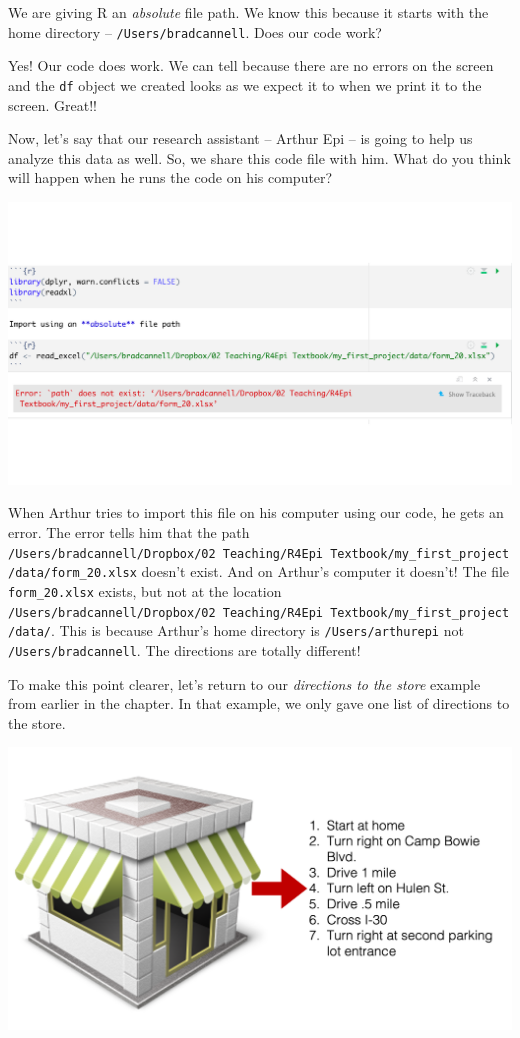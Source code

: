 \documentclass[
  letterpaper,
  DIV=11,
  numbers=noendperiod]{scrreprt}
\begin{document}
We are giving R an \emph{absolute} file path. We know this because it
starts with the home directory -- \texttt{/Users/bradcannell}. Does our
code work?

Yes! Our code does work. We can tell because there are no errors on the
screen and the \texttt{df} object we created looks as we expect it to
when we print it to the screen. Great!!

Now, let's say that our research assistant -- Arthur Epi -- is going to
help us analyze this data as well. So, we share this code file with him.
What do you think will happen when he runs the code on his computer?

\includegraphics{chapters/file_paths/relative_file_paths_02_absolute_arthur.png}

When Arthur tries to import this file on his computer using our code, he
gets an error. The error tells him that the path
\texttt{/Users/bradcannell/Dropbox/02\ Teaching/R4Epi\ Textbook/my\_first\_project/data/form\_20.xlsx}
doesn't exist. And on Arthur's computer it doesn't! The file
\texttt{form\_20.xlsx} exists, but not at the location
\texttt{/Users/bradcannell/Dropbox/02\ Teaching/R4Epi\ Textbook/my\_first\_project/data/}.
This is because Arthur's home directory is \texttt{/Users/arthurepi} not
\texttt{/Users/bradcannell}. The directions are totally different!

To make this point clearer, let's return to our \emph{directions to the
store} example from earlier in the chapter. In that example, we only
gave one list of directions to the store.

\includegraphics{chapters/file_paths/directions.png}
\end{document}
